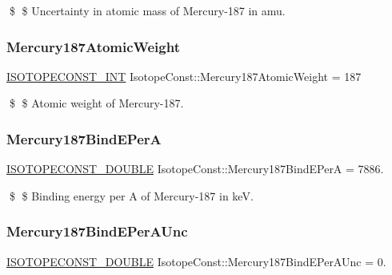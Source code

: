\$ \$ Uncertainty in atomic mass of Mercury-\/187 in amu. \mbox{\label{group___isotope_const-_mercury-_hg187_gab6f1dcde7994288182f1f4aaae670210}} 
\subsubsection{\texorpdfstring{Mercury187\+Atomic\+Weight}{Mercury187AtomicWeight}}
{\footnotesize\ttfamily \mbox{\hyperlink{group___isotope_const-_macros_ga5f18360b3e99483a35c32d789e62621c}{I\+S\+O\+T\+O\+P\+E\+C\+O\+N\+S\+T\+\_\+\+I\+NT}} Isotope\+Const\+::\+Mercury187\+Atomic\+Weight = 187}

\$ \$ Atomic weight of Mercury-\/187. \mbox{\label{group___isotope_const-_mercury-_hg187_ga44d8df5c557b3754a249da81de97259d}} 
\subsubsection{\texorpdfstring{Mercury187\+Bind\+E\+PerA}{Mercury187BindEPerA}}
{\footnotesize\ttfamily \mbox{\hyperlink{group___isotope_const-_macros_ga8f45a7272ce02c0b4c65c44636ed719a}{I\+S\+O\+T\+O\+P\+E\+C\+O\+N\+S\+T\+\_\+\+D\+O\+U\+B\+LE}} Isotope\+Const\+::\+Mercury187\+Bind\+E\+PerA = 7886.}

\$ \$ Binding energy per A of Mercury-\/187 in keV. \mbox{\label{group___isotope_const-_mercury-_hg187_ga35f473f6374073f523f5252356e5e0a7}} 
\subsubsection{\texorpdfstring{Mercury187\+Bind\+E\+Per\+A\+Unc}{Mercury187BindEPerAUnc}}
{\footnotesize\ttfamily \mbox{\hyperlink{group___isotope_const-_macros_ga8f45a7272ce02c0b4c65c44636ed719a}{I\+S\+O\+T\+O\+P\+E\+C\+O\+N\+S\+T\+\_\+\+D\+O\+U\+B\+LE}} Isotope\+Const\+::\+Mercury187\+Bind\+E\+Per\+A\+Unc = 0.}

